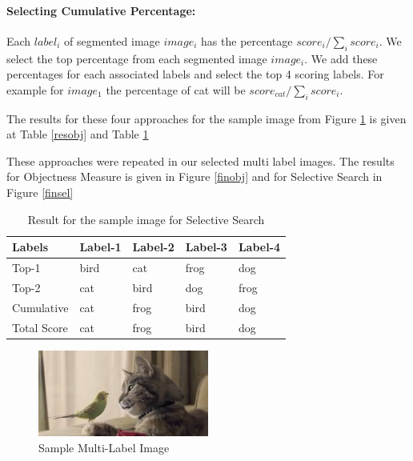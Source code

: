 \paragraph{Selecting Cumulative Percentage:}
Each $label_{i}$ of segmented image $image_{i}$ has the percentage $score_{i} / \sum_{i}{score_{i}}$. We select the top percentage from each segmented image $image_{i}$. We add these percentages for each associated labels and select the top 4 scoring labels. For example for $image_{1}$ the percentage of cat will be $score_{cat} / \sum_{i}{score_{i}}$.\hfill \break

The results for these four approaches for the sample image from Figure \ref{sample_multi_label} is given at Table \ref{resobj} and Table \ref{ressel} \hfill \break


These approaches were repeated in our selected multi label images. The results for Objectness Measure is given in Figure \ref{finobj} and for Selective Search in Figure  \ref{finsel}

\begin{table}
\centering
\caption{Result for the sample image for Selective Search}
\label{ressel}
\begin{tabularx}{\linewidth}{|*{5}{X|}}
\hline
Labels      & Label-1 & Label-2 & Label-3 & Label-4 \\ \hline
Top-1       & bird    & cat     & frog    & dog           \\ \hline
Top-2       & cat     & bird    & dog     & frog           \\ \hline
Cumulative  & cat     & frog    & bird    & dog            \\ \hline
Total Score & cat     & frog    & bird    & dog           \\ \hline
\end{tabularx}
\end{table}

\begin{figure}
  \centering
  \includegraphics[width=0.5\textwidth]{images/sample_multi_label.PNG}
  \caption{Sample Multi-Label Image}\label{sample_multi_label}
\end{figure}


